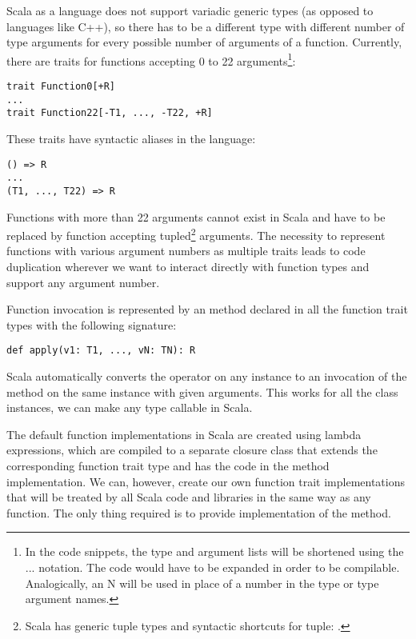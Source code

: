 Scala as a language does not support variadic generic types (as opposed to languages like C++), so there has to be a different type with different number of type arguments for every possible number of arguments of a function. Currently, there are traits for functions accepting 0 to 22 arguments\footnote{In the code snippets, the type and argument lists will be shortened using the ... notation. The code would have to be expanded in order to be compilable. Analogically, an N will be used in place of a number in the type or type argument names.}:

\lstset{style=Scala}
\begin{lstlisting}
trait Function0[+R]
...
trait Function22[-T1, ..., -T22, +R]
\end{lstlisting}

These traits have syntactic aliases in the language:

\lstset{style=Scala}
\begin{lstlisting}
() => R
...
(T1, ..., T22) => R
\end{lstlisting}

Functions with more than 22 arguments cannot exist in Scala and have to be replaced by function accepting tupled\footnote{Scala has generic tuple types and syntactic shortcuts for tuple: .} arguments. The necessity to represent functions with various argument numbers as multiple traits leads to code duplication wherever we want to interact directly with function types and support any argument number.

Function invocation is represented by an  method declared in all the function trait types with the following signature:
\lstset{style=Scala}
\begin{lstlisting}
def apply(v1: T1, ..., vN: TN): R
\end{lstlisting}

Scala automatically converts the \inlinecode{()} operator on any instance to an invocation of the  method on the same instance with given arguments. This works for all the class instances, we can make any type callable in Scala.

The default function implementations in Scala are created using lambda expressions, which are compiled to a separate closure class that extends the corresponding function trait type and has the code in the  method implementation. We can, however, create our own function trait implementations that will be treated by all Scala code and libraries in the same way as any function. The only thing required is to provide implementation of the  method.

